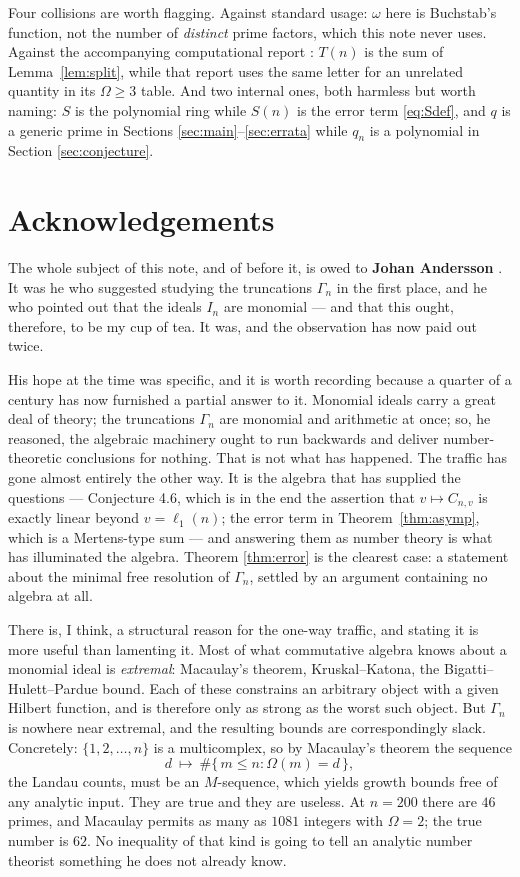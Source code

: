 \documentclass[a4paper,11pt,oneside,reqno]{amsart}
\theoremstyle{definition}
\theoremstyle{remark}
\theoremstyle{plain}
\newcommand{\Om}{\Omega}
\newcommand{\Gam}{\Gamma}
\begin{document}
Four collisions are worth flagging. Against standard usage: \(\omega\) here is
Buchstab's function, not the number of \emph{distinct} prime factors, which this
note never uses. Against the accompanying computational report \cite{gitrepo}:
\(T(n)\) is the sum of Lemma~\ref{lem:split}, while that report uses the same
letter for an unrelated quantity in its \(\Om \ge 3\) table. And two internal ones,
both harmless but worth naming: \(S\) is the polynomial ring while \(S(n)\) is
the error term \eqref{eq:Sdef}, and \(q\) is a generic prime in Sections
\ref{sec:main}--\ref{sec:errata} while \(q_n\) is a polynomial in Section
\ref{sec:conjecture}.

\section*{Acknowledgements}

The whole subject of this note, and of \cite{Snellman2000} before it, is owed
to \textbf{Johan Andersson} . It was he who
suggested studying the truncations \(\Gam_n\) in the first place, and he who
pointed out that the ideals \(I_n\) are monomial --- and that this ought,
therefore, to be my cup of tea. It was, and the observation has now paid out
twice.

His hope at the time was specific, and it is worth recording because a quarter
of a century has now furnished a partial answer to it. Monomial ideals carry a
great deal of theory; the truncations \(\Gam_n\) are monomial and arithmetic at
once; so, he reasoned, the algebraic machinery ought to run backwards and
deliver number-theoretic conclusions for nothing. That is not what has happened.
The traffic has gone almost entirely the other way. It is the algebra that has
supplied the questions --- Conjecture 4.6, which is in the end the assertion
that \(v\mapsto C_{n,v}\) is exactly linear beyond \(v = \ell_1(n)\); the error
term in Theorem~\ref{thm:asymp}, which is a Mertens-type sum --- and answering
them as number theory is what has illuminated the algebra. Theorem
\ref{thm:error} is the clearest case: a statement about the minimal free
resolution of \(\Gam_n\), settled by an argument containing no algebra at all.

There is, I think, a structural reason for the one-way traffic, and stating it
is more useful than lamenting it. Most of what commutative algebra knows about
a monomial ideal is \emph{extremal}: Macaulay's theorem, Kruskal--Katona, the
Bigatti--Hulett--Pardue bound. Each of these constrains an arbitrary object with
a given Hilbert function, and is therefore only as strong as the worst such
object. But \(\Gam_n\) is nowhere near extremal, and the resulting bounds are
correspondingly slack. Concretely: \(\{1,2,\dots,n\}\) is a multicomplex, so by
Macaulay's theorem the sequence
\[
  d\ \longmapsto\ \#\{\,m \le n : \Om(m) = d\,\},
\]
the Landau counts, must be an \(M\)-sequence, which yields growth bounds free of
any analytic input. They are true and they are useless. At \(n = 200\) there are
\(46\) primes, and Macaulay permits as many as \(1081\) integers with
\(\Om = 2\); the true number is \(62\). No inequality of that kind is going to
tell an analytic number theorist something he does not already know.
\end{document}
